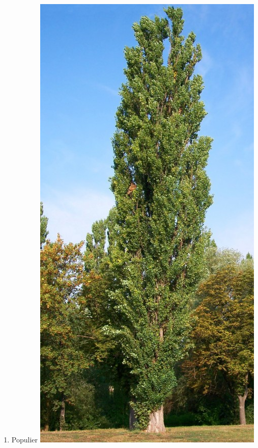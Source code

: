 \documentclass[a4paper, handout]{beamer}
\begin{document}
\begin{frame}
\begin{enumerate}
		\item{Populier}
		\includegraphics[scale=0.08]{populier}
	\end{enumerate}
	
\end{frame}
\end{document}
